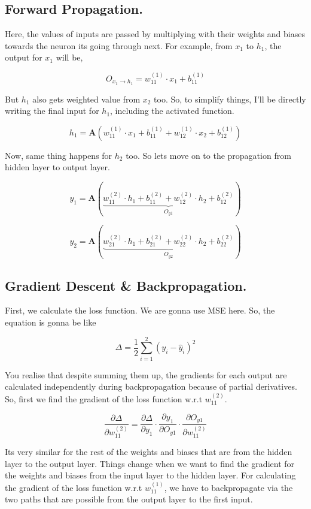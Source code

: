 \documentclass[12pt]{article}
\begin{document}
\subsection*{Forward Propagation.}

Here, the values of inputs are passed by multiplying with their weights and biases towards the neuron its going through next. For example, from \(x_1\) to \(h_1\), the output for \(x_1\) will be,

\[
    O_{x_1 \to h_1} = w_{11}^{(1)} \cdot x_1 + b_{11}^{(1)}
\]

But \(h_1\) also gets weighted value from \(x_2\) too. So, to simplify things, I'll be directly writing the final input for \(h_1\), including the activated function.

\[
    h_1 = \mathbf{A} (w_{11}^{(1)} \cdot x_1 + b_{11}^{(1)} + w_{12}^{(1)} \cdot x_2 + b_{12}^{(1)})
\]

Now, same thing happens for \(h_2\) too. So lets move on to the propagation from hidden layer to output layer. 

\[
  y_1 = \mathbf{A} (\underbrace{w_{11}^{(2)} \cdot h_1 + b_{11}^{(2)} + w_{12}^{(2)} \cdot h_2 + b_{12}^{(2)}}_{O_{y1} })
\]

\[
  y_2 = \mathbf{A} (\underbrace{w_{21}^{(2)} \cdot h_1 + b_{21}^{(2)} + w_{22}^{(2)} \cdot h_2 + b_{22}^{(2)}}_{O_{y2} })
\]

\subsection*{Gradient Descent \& Backpropagation.}

First, we calculate the loss function. We are gonna use MSE here. So, the equation is gonna be like

\[
  \Delta = \frac{1}{2} \sum_{i=1}^{2} (y_i - \hat{y}_i)^2
\]

You realise that despite summing them up, the gradients for each output are calculated independently during backpropagation because of partial derivatives. So, first we find the gradient of the loss function w.r.t \(w_{11}^{(2)} \).  

\[
  \frac{\partial \Delta }{\partial w_{11}^{(2)}} = \frac{\partial \Delta }{\partial y_1} \cdot \frac{\partial y_1}{\partial O_{y1} } \cdot \frac{\partial O_{y1} }{\partial w_{11}^{(2)}}
\]

Its very similar for the rest of the weights and biases that are from the hidden layer to the output layer. Things change when we want to find the gradient for the weights and biases from the input layer to the hidden layer. For calculating the gradient of the loss function w.r.t \(w_{11}^{(1)}\), we have to backpropagate via the two paths that are possible from the output layer to the first input. 
\end{document}
